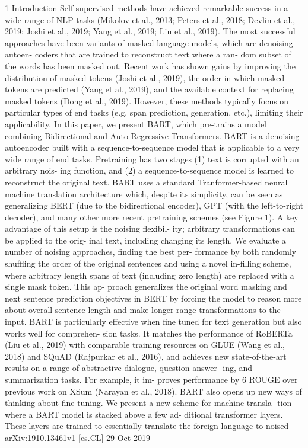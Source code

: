 1 Introduction Self-supervised methods have achieved remarkable success in a wide range of NLP tasks (Mikolov et al., 2013; Peters et al., 2018; Devlin et al., 2019; Joshi et al., 2019; Yang et al., 2019; Liu et al., 2019). The most successful approaches have been variants of masked language models, which are denoising autoen- coders that are trained to reconstruct text where a ran- dom subset of the words has been masked out. Recent work has shown gains by improving the distribution of masked tokens (Joshi et al., 2019), the order in which masked tokens are predicted (Yang et al., 2019), and the available context for replacing masked tokens (Dong et al., 2019). However, these methods typically focus on particular types of end tasks (e.g. span prediction, generation, etc.), limiting their applicability. In this paper, we present BART, which pre-trains a model combining Bidirectional and Auto-Regressive Transformers. BART is a denoising autoencoder built with a sequence-to-sequence model that is applicable to a very wide range of end tasks. Pretraining has two stages (1) text is corrupted with an arbitrary nois- ing function, and (2) a sequence-to-sequence model is learned to reconstruct the original text. BART uses a standard Tranformer-based neural machine translation architecture which, despite its simplicity, can be seen as generalizing BERT (due to the bidirectional encoder), GPT (with the left-to-right decoder), and many other more recent pretraining schemes (see Figure 1). A key advantage of this setup is the noising ﬂexibil- ity; arbitrary transformations can be applied to the orig- inal text, including changing its length. We evaluate a number of noising approaches, ﬁnding the best per- formance by both randomly shufﬂing the order of the original sentences and using a novel in-ﬁlling scheme, where arbitrary length spans of text (including zero length) are replaced with a single mask token. This ap- proach generalizes the original word masking and next sentence prediction objectives in BERT by forcing the model to reason more about overall sentence length and make longer range transformations to the input. BART is particularly effective when ﬁne tuned for text generation but also works well for comprehen- sion tasks. It matches the performance of RoBERTa (Liu et al., 2019) with comparable training resources on GLUE (Wang et al., 2018) and SQuAD (Rajpurkar et al., 2016), and achieves new state-of-the-art results on a range of abstractive dialogue, question answer- ing, and summarization tasks. For example, it im- proves performance by 6 ROUGE over previous work on XSum (Narayan et al., 2018). BART also opens up new ways of thinking about ﬁne tuning. We present a new scheme for machine transla- tion where a BART model is stacked above a few ad- ditional transformer layers. These layers are trained to essentially translate the foreign language to noised arXiv:1910.13461v1 [cs.CL] 29 Oct 2019

